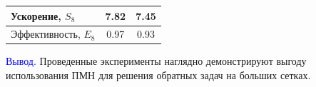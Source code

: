 \documentclass[10pt,pdf, mathserif, hyperref={unicode}]{beamer}
\begin{document}
\begin{frame}
\begin{table}[]
\begin{tabular}{|l|c|c|}
			Ускорение, $S_8$                                                                      & 7.82                                                                                                   & 7.45                                                                                                      \\ \hline
			Эффективность, $E_8$                                                                      & 0.97                                                                                                   & 0.93                                                                                                      \\ \hline    
		\end{tabular}
	\end{table}
	{\textcolor{blue}{Вывод.}} Проведенные эксперименты наглядно демонстрируют выгоду использования ПМН для решения обратных задач на больших сетках.
\end{frame}
\end{document}
